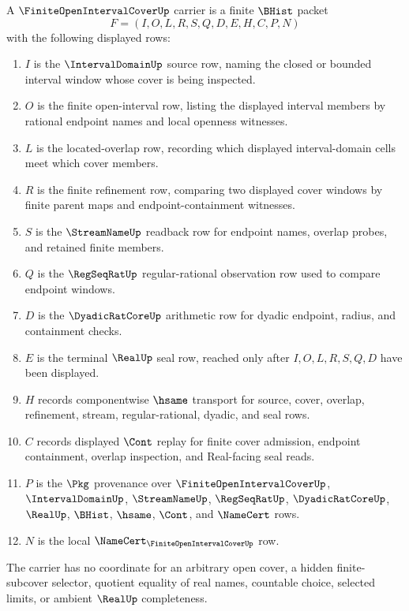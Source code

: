 \begin{definition}
\label{def:finite-open-interval-cover-up-carrier}
A $\FiniteOpenIntervalCoverUp$ carrier is a finite $\BHist$ packet
$$
F=(I,O,L,R,S,Q,D,E,H,C,P,N)
$$
with the following displayed rows:
\begin{enumerate}
  \item $I$ is the $\IntervalDomainUp$ source row, naming the closed or bounded interval window whose cover is being inspected.
  \item $O$ is the finite open-interval row, listing the displayed interval members by rational endpoint names and local openness witnesses.
  \item $L$ is the located-overlap row, recording which displayed interval-domain cells meet which cover members.
  \item $R$ is the finite refinement row, comparing two displayed cover windows by finite parent maps and endpoint-containment witnesses.
  \item $S$ is the $\StreamNameUp$ readback row for endpoint names, overlap probes, and retained finite members.
  \item $Q$ is the $\RegSeqRatUp$ regular-rational observation row used to compare endpoint windows.
  \item $D$ is the $\DyadicRatCoreUp$ arithmetic row for dyadic endpoint, radius, and containment checks.
  \item $E$ is the terminal $\RealUp$ seal row, reached only after $I,O,L,R,S,Q,D$ have been displayed.
  \item $H$ records componentwise $\hsame$ transport for source, cover, overlap, refinement, stream, regular-rational, dyadic, and seal rows.
  \item $C$ records displayed $\Cont$ replay for finite cover admission, endpoint containment, overlap inspection, and Real-facing seal reads.
  \item $P$ is the $\Pkg$ provenance over $\FiniteOpenIntervalCoverUp$, $\IntervalDomainUp$, $\StreamNameUp$, $\RegSeqRatUp$, $\DyadicRatCoreUp$, $\RealUp$, $\BHist$, $\hsame$, $\Cont$, and $\NameCert$ rows.
  \item $N$ is the local $\NameCert_{\FiniteOpenIntervalCoverUp}$ row.
\end{enumerate}
The carrier has no coordinate for an arbitrary open cover, a hidden finite-subcover selector, quotient equality of real names, countable choice, selected limits, or ambient $\RealUp$ completeness.
\end{definition}

